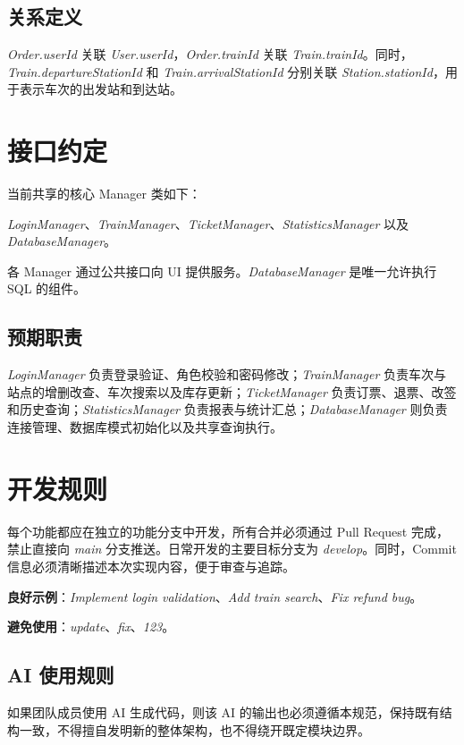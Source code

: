 \documentclass[10pt,twocolumn]{ctexart}
\begin{document}
\subsection*{关系定义}
\textit{Order.userId} 关联 \textit{User.userId}，\textit{Order.trainId} 关联 \textit{Train.trainId}。同时，\textit{Train.departureStationId} 和 \textit{Train.arrivalStationId} 分别关联 \textit{Station.stationId}，用于表示车次的出发站和到达站。

\section{接口约定}
当前共享的核心 Manager 类如下：

\textit{LoginManager}、\textit{TrainManager}、\textit{TicketManager}、\textit{StatisticsManager} 以及 \textit{DatabaseManager}。

各 Manager 通过公共接口向 UI 提供服务。\textit{DatabaseManager} 是唯一允许执行 SQL 的组件。

\subsection*{预期职责}

\textit{LoginManager} 负责登录验证、角色校验和密码修改；\textit{TrainManager} 负责车次与站点的增删改查、车次搜索以及库存更新；\textit{TicketManager} 负责订票、退票、改签和历史查询；\textit{StatisticsManager} 负责报表与统计汇总；\textit{DatabaseManager} 则负责连接管理、数据库模式初始化以及共享查询执行。

\section{开发规则}
每个功能都应在独立的功能分支中开发，所有合并必须通过 Pull Request 完成，禁止直接向 \textit{main} 分支推送。日常开发的主要目标分支为 \textit{develop}。同时，Commit 信息必须清晰描述本次实现内容，便于审查与追踪。

\textbf{良好示例}：\textit{Implement login validation}、\textit{Add train search}、\textit{Fix refund bug}。

\textbf{避免使用}：\textit{update}、\textit{fix}、\textit{123}。

\subsection*{AI 使用规则}

如果团队成员使用 AI 生成代码，则该 AI 的输出也必须遵循本规范，保持既有结构一致，不得擅自发明新的整体架构，也不得绕开既定模块边界。
\end{document}
